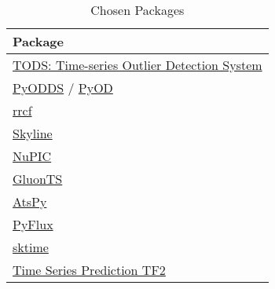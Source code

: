 \begin{table}[h]\centering
        \begin{tabular}{l}
            Package                                                                                                 \\\midrule
            \href{https://github.com/datamllab/tods}{TODS: Time-series Outlier Detection System}                    \\\addlinespace
            \href{https://github.com/datamllab/pyodds}{PyODDS} / \href{https://github.com/yzhao062/pyod}{PyOD}      \\\addlinespace
            \href{https://github.com/kLabUM/rrcf}{rrcf}                                                             \\\addlinespace
            \href{https://github.com/earthgecko/skyline}{Skyline}                                                   \\\addlinespace
            \href{https://github.com/numenta/nupic}{NuPIC}                                                          \\\addlinespace
            
            \href{https://github.com/awslabs/gluon-ts}{GluonTS}                                                     \\\addlinespace
            \href{https://github.com/firmai/atspy}{AtsPy}                                                           \\\addlinespace
            \href{https://github.com/RJT1990/pyflux}{PyFlux}                                                        \\\addlinespace
            \href{https://github.com/alan-turing-institute/sktime}{sktime}                                          \\\addlinespace
            \href{https://github.com/LongxingTan/Time-series-prediction}{Time Series Prediction TF2}                \\
        \end{tabular}
    \caption{Chosen Packages}\label{tab:chosen-packages}
\end{table}


